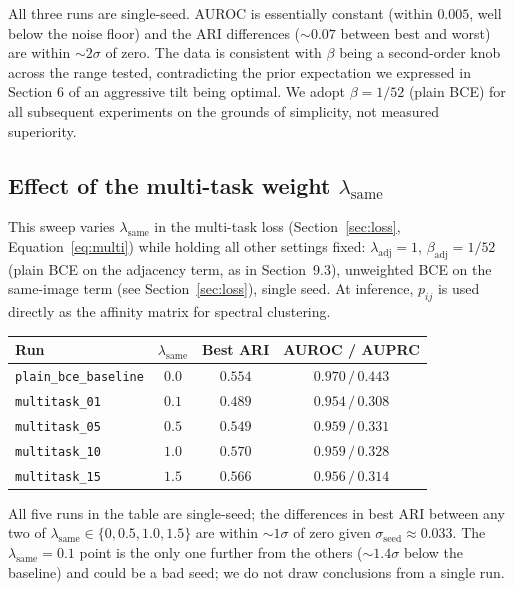 \documentclass[12pt, a4paper]{article}
\begin{document}
All three runs are single-seed. AUROC is essentially constant
(within $0.005$, well below the noise floor) and the ARI differences
($\sim 0.07$ between best and worst) are within $\sim 2\sigma$ of zero. The
data is consistent with $\beta$ being a second-order knob across the range
tested, contradicting the prior expectation we expressed in Section 6 of an
aggressive tilt being optimal. We adopt $\beta = 1/52$ (plain BCE) for all
subsequent experiments on the grounds of simplicity, not measured
superiority.

\subsection{Effect of the multi-task weight $\lambda_{\text{same}}$}

This sweep varies $\lambda_{\text{same}}$ in the multi-task loss
(Section~\ref{sec:loss}, Equation~\eqref{eq:multi}) while holding all other
settings fixed: $\lambda_{\text{adj}} = 1$, $\beta_{\text{adj}} = 1/52$
(plain BCE on the adjacency term, as in Section~9.3), unweighted BCE on the
same-image term (see Section~\ref{sec:loss}), single seed. At inference,
$p_{ij}$ is used directly as the affinity matrix for spectral clustering.

\begin{center}
\begin{tabular}{lccc}
\toprule
\textbf{Run} & \textbf{$\lambda_{\text{same}}$} & \textbf{Best ARI} & \textbf{AUROC / AUPRC} \\
\midrule
\texttt{plain\_bce\_baseline}  & $0.0$ & $0.554$         & $0.970 \,/\, 0.443$ \\
\texttt{multitask\_01}         & $0.1$ & $0.489$         & $0.954 \,/\, 0.308$ \\
\texttt{multitask\_05}         & $0.5$ & $0.549$         & $0.959 \,/\, 0.331$ \\
\texttt{multitask\_10}         & $1.0$ & $\mathbf{0.570}$& $0.959 \,/\, 0.328$ \\
\texttt{multitask\_15}         & $1.5$ & $0.566$         & $0.956 \,/\, 0.314$ \\
\bottomrule
\end{tabular}
\end{center}

All five runs in the table are single-seed; the differences in best ARI
between any two of $\lambda_{\text{same}} \in \{0, 0.5, 1.0, 1.5\}$ are
within $\sim 1\sigma$ of zero given $\sigma_{\text{seed}} \approx 0.033$.
The $\lambda_{\text{same}} = 0.1$ point is the only one further from the
others ($\sim 1.4\sigma$ below the baseline) and could be a bad seed; we do
not draw conclusions from a single run.
\end{document}
